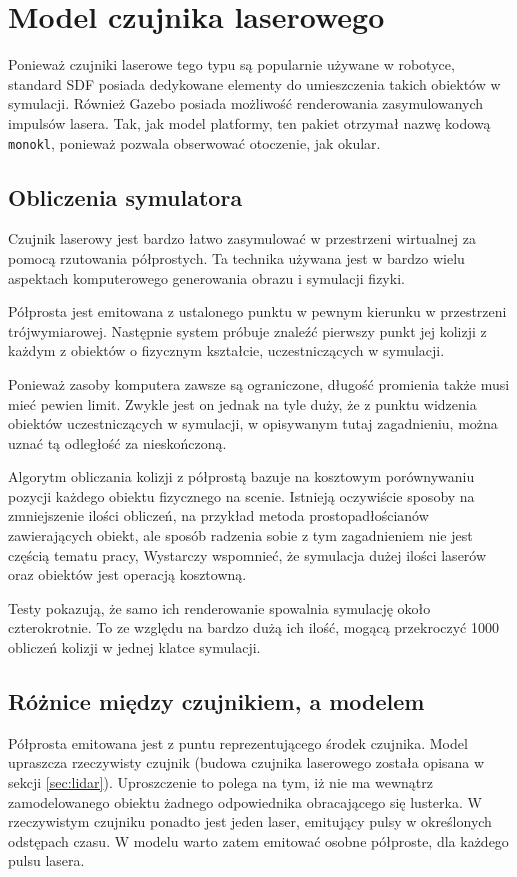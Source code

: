 \chapter{Model czujnika laserowego}
\label{sec:monokl}
Ponieważ czujniki laserowe tego typu są popularnie używane w robotyce, standard SDF posiada dedykowane elementy do umieszczenia takich obiektów w symulacji.
Również Gazebo posiada możliwość renderowania zasymulowanych impulsów lasera.
Tak, jak model platformy, ten pakiet otrzymał nazwę kodową \texttt{monokl}, ponieważ pozwala obserwować otoczenie, jak okular.

\section{Obliczenia symulatora}
	Czujnik laserowy jest bardzo łatwo zasymulować w przestrzeni wirtualnej za pomocą rzutowania półprostych.
	Ta technika używana jest w bardzo wielu aspektach komputerowego generowania obrazu i symulacji fizyki.

	Półprosta jest emitowana z ustalonego punktu w pewnym kierunku w przestrzeni trójwymiarowej.
	Następnie system próbuje znaleźć pierwszy punkt jej kolizji z każdym z obiektów o fizycznym kształcie, uczestniczących w symulacji.
	
	Ponieważ zasoby komputera zawsze są ograniczone, długość promienia także musi mieć pewien limit. 
	Zwykle jest on jednak na tyle duży, że z punktu widzenia obiektów uczestniczących w symulacji, w opisywanym tutaj zagadnieniu, 
	można uznać tą odległość za nieskończoną.

	Algorytm obliczania kolizji z półprostą bazuje na kosztowym porównywaniu pozycji każdego obiektu fizycznego na scenie.
	Istnieją oczywiście sposoby na zmniejszenie ilości obliczeń, na przykład metoda prostopadłościanów zawierających obiekt, ale sposób radzenia sobie z tym zagadnieniem nie jest
	częścią tematu pracy,
	Wystarczy wspomnieć, że symulacja dużej ilości laserów oraz obiektów jest operacją kosztowną.
	
	Testy pokazują, że samo ich renderowanie spowalnia symulację około czterokrotnie.
	To ze względu na bardzo dużą ich ilość, mogącą przekroczyć 1000 obliczeń kolizji w jednej klatce symulacji.

\section{Różnice między czujnikiem, a modelem}
	Półprosta emitowana jest z puntu reprezentującego środek czujnika.
	Model upraszcza rzeczywisty czujnik (budowa czujnika laserowego została opisana w sekcji \ref{sec:lidar}).
	Uproszczenie to polega na tym, iż nie ma wewnątrz zamodelowanego obiektu żadnego odpowiednika obracającego się lusterka.
	W rzeczywistym czujniku ponadto jest jeden laser, emitujący pulsy w określonych odstępach czasu.
	W modelu warto zatem emitować osobne półproste, dla każdego pulsu lasera.

